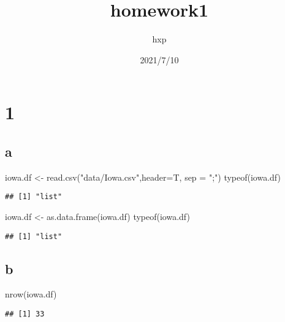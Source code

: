 \documentclass[
]{article}
\title{homework1}
\author{hxp}
\date{2021/7/10}
\newenvironment{Shaded}{\begin{snugshade}}{\end{snugshade}}
\newcommand{\AttributeTok}[1]{\textcolor[rgb]{0.77,0.63,0.00}{#1}}
\newcommand{\FunctionTok}[1]{\textcolor[rgb]{0.00,0.00,0.00}{#1}}
\newcommand{\NormalTok}[1]{#1}
\newcommand{\OtherTok}[1]{\textcolor[rgb]{0.56,0.35,0.01}{#1}}
\newcommand{\StringTok}[1]{\textcolor[rgb]{0.31,0.60,0.02}{#1}}
\begin{document}
\maketitle

\hypertarget{section}{%
\section{1}\label{section}}

\hypertarget{a}{%
\subsection{a}\label{a}}

\begin{Shaded}
\begin{Highlighting}[]
\NormalTok{iowa.df }\OtherTok{\textless{}{-}} \FunctionTok{read.csv}\NormalTok{(}\StringTok{"data/Iowa.csv"}\NormalTok{,}\AttributeTok{header=}\NormalTok{T, }\AttributeTok{sep =} \StringTok{";"}\NormalTok{)}
\FunctionTok{typeof}\NormalTok{(iowa.df)}
\end{Highlighting}
\end{Shaded}

\begin{verbatim}
## [1] "list"
\end{verbatim}

\begin{Shaded}
\begin{Highlighting}[]
\NormalTok{iowa.df }\OtherTok{\textless{}{-}} \FunctionTok{as.data.frame}\NormalTok{(iowa.df)}
\FunctionTok{typeof}\NormalTok{(iowa.df)}
\end{Highlighting}
\end{Shaded}

\begin{verbatim}
## [1] "list"
\end{verbatim}

\hypertarget{b}{%
\subsection{b}\label{b}}

\begin{Shaded}
\begin{Highlighting}[]
\FunctionTok{nrow}\NormalTok{(iowa.df)}
\end{Highlighting}
\end{Shaded}

\begin{verbatim}
## [1] 33
\end{verbatim}
\end{document}
